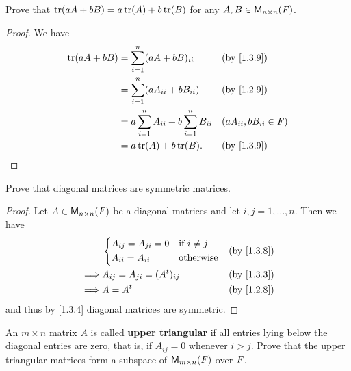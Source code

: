 \begin{ex}\label{ex:1.3.6}
	Prove that \(\tr{aA + bB} = a\tr{A} + b\tr{B}\) for any \(A, B \in \mathsf{M}_{{n} \times n}({\mathit{F}})\).
\end{ex}

\begin{proof}
	We have
	\begin{align*}
		\tr{aA + bB} & = \sum_{i = 1}^n (aA + bB)_{i i}                      &  & \text{(by \cref{1.3.9})}    \\
		             & = \sum_{i = 1}^n (aA_{i i} + bB_{i i})                &  & \text{(by \cref{1.2.9})}    \\
		             & = a \sum_{i = 1}^n A_{i i} + b \sum_{i = 1}^n B_{i i} &  & (aA_{i i}, bB_{i i} \in \F) \\
		             & = a\tr{A} + b\tr{B}.                                  &  & \text{(by \cref{1.3.9})}
	\end{align*}
\end{proof}

\begin{ex}\label{ex:1.3.7}
	Prove that diagonal matrices are symmetric matrices.
\end{ex}

\begin{proof}
	Let \(A \in \mathsf{M}_{{n} \times n}({\mathit{F}})\) be a diagonal matrices and let \(i, j = 1, \dots, n\).
	Then we have
	\begin{align*}
		         & \begin{dcases}
			A_{i j} = A_{j i} = 0 & \text{if } i \neq j \\
			A_{i i} = A_{i i}     & \text{otherwise}
		\end{dcases}         &  & \text{(by \cref{1.3.8})} \\
		\implies & A_{i j} = A_{j i} = (\tp{A})_{i j} &  & \text{(by \cref{1.3.3})} \\
		\implies & A = \tp{A}                         &  & \text{(by \cref{1.2.8})}
	\end{align*}
	and thus by \cref{1.3.4} diagonal matrices are symmetric.
\end{proof}

\setcounter{ex}{11}
\begin{ex}\label{ex:1.3.12}
	An \(m \times n\) matrix \(A\) is called \textbf{upper triangular} if all entries lying below the diagonal entries are zero, that is, if \(A_{i j} = 0\) whenever \(i > j\).
	Prove that the upper triangular matrices form a subspace of \(\mathsf{M}_{{m} \times n}({\mathit{F}})\) over \(\mathit{F}\).
\end{ex}

